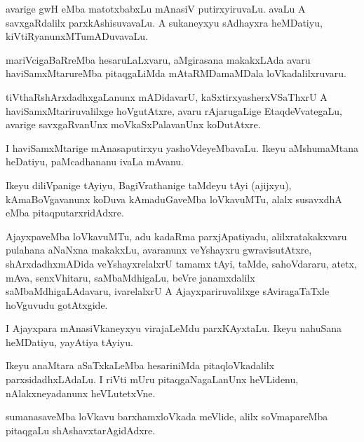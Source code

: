 \documentclass{article}
\begin{document}
\begin{mn}
avarige gwH eMba matotxbabxLu mAnasiV putirxyiruvaLu. avaLu A
savxgaRdalilx parxkAshisuvavaLu. A sukaneyxyu sAdhayxra heMDatiyu, kiVtiRyanunxMTumADuvavaLu.
\end{mn}

\begin{mn}
mariVcigaBaRreMba hesaruLaLxvaru, aMgirasana makakxLAda avaru
haviSamxMtarureMba pitaqgaLiMda mAtaRMDamaMDala loVkadalilxruvaru.
\end{mn}

\begin{mn}
tiVthaRshArxdadhxgaLanunx mADidavarU, kaSxtirxyasherxVSaThxrU A
haviSamxMtariruvalilxge hoVgutAtxre, avaru rAjarugaLige
EtaqdeVvategaLu, avarige savxgaRvanUnx moVkaSxPalavanUnx koDutAtxre.
\end{mn}

\begin{mn}%
I haviSamxMtarige mAnasaputirxyu yashoVdeyeMbavaLu. Ikeyu aMshumaMtana
heDatiyu, paMcadhananu ivaLa mAvanu.
\end{mn}

\begin{mn}
Ikeyu diliVpanige tAyiyu, BagiVrathanige taMdeyu tAyi (ajijxyu),
kAmaBoVgavanunx koDuva kAmaduGaveMba loVkavuMTu, alalx susavxdhA eMba pitaqputarxridAdxre.
\end{mn}

\begin{mn}%
AjayxpaveMba loVkavuMTu, adu kadaRma parxjApatiyadu, alilxratakakxvaru
pulahana aNaNxna makakxLu, avaranunx veYshayxru gwravisutAtxre,
shArxdadhxmADida veYshayxrelalxrU tamamx tAyi, taMde, sahoVdararu,
atetx, mAva, senxVhitaru, saMbaMdhigaLu, beVre janamxdalilx
saMbaMdhigaLAdavaru, ivarelalxrU A Ajayxpariruvalilxge sAviragaTaTxle
hoVguvudu gotAtxgide.
\end{mn}

\begin{mn}
I Ajayxpara mAnasiVkaneyxyu virajaLeMdu parxKAyxtaLu. Ikeyu nahuSana
heMDatiyu, yayAtiya tAyiyu.
\end{mn}

\begin{mn}%
Ikeyu anaMtara aSaTxkaLeMba hesariniMda pitaqloVkadalilx
parxsidadhxLAdaLu. I riVti mUru pitaqgaNagaLanUnx heVLidenu,
nAlakxneyadanunx heVLutetxVne.
\end{mn}

\begin{mn}
sumanasaveMba loVkavu barxhamxloVkada meVlide, alilx soVmapareMba
pitaqgaLu shAshavxtarAgidAdxre.
\end{mn}
\end{document}
